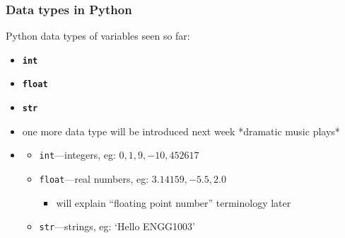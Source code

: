 \documentclass[english,14pt]{beamer}
\begin{document}
\begin{frame}[fragile]

\frametitle{Data types in Python}

Python data types of variables seen so far:

	\begin{itemize}
		\item \textbf{\texttt{int}}
		\item \textbf{\texttt{float}}
		\item \textbf{\texttt{str}}
		\item one more data type will be introduced next week *dramatic music plays*
	\end{itemize}
	
\begin{itemize}
\item[]
	\begin{itemize}
		\item \texttt{int}---integers, eg: $0,1,9,-10,452617$
		\item \texttt{float}---real numbers, eg: $3.14159, -5.5, 2.0$
			\begin{itemize}
				\item will explain ``floating point number'' terminology later
			\end{itemize}
		\item \texttt{str}---strings, eg: `Hello ENGG1003'
	\end{itemize}
\end{itemize}

\end{frame}

\end{document}
